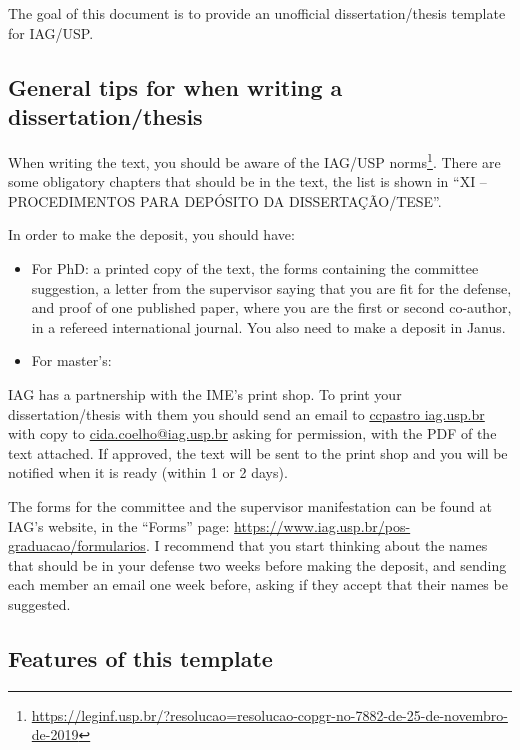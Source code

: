 \setcounter{page}{0}
\chapter{\chapternameintro}

  The goal of this document is to provide an unofficial dissertation/thesis template for IAG/USP.

  \section{General tips for when writing a dissertation/thesis}

  When writing the text, you should be aware of the IAG/USP norms\footnote{\url{https://leginf.usp.br/?resolucao=resolucao-copgr-no-7882-de-25-de-novembro-de-2019}}. There are some obligatory chapters that should be in the text, the list is shown in ``XI – PROCEDIMENTOS PARA DEPÓSITO DA DISSERTAÇÃO/TESE''.

  In order to make the deposit, you should have:
  \begin{itemize}
    \item For PhD: a printed copy of the text, the forms containing the committee suggestion, a letter from the supervisor saying that you are fit for the defense, and proof of one published paper, where you are the first or second co-author, in a refereed international journal. You also need to make a deposit in Janus.
    \item For master's: 
  \end{itemize}

  IAG has a partnership with the IME's print shop. To print your dissertation/thesis with them you should send an email to \url{ccpastro iag.usp.br} with copy to \url{cida.coelho@iag.usp.br} asking for permission, with the PDF of the text attached. If approved, the text will be sent to the print shop and you will be notified when it is ready (within 1 or 2 days).

  The forms for the committee and the supervisor manifestation can be found at IAG's website, in the ``Forms'' page: \url{https://www.iag.usp.br/pos-graduacao/formularios}. I recommend that you start thinking about the names that should be in your defense two weeks before making the deposit, and sending each member an email one week before, asking if they accept that their names be suggested.

  \section{Features of this template}

